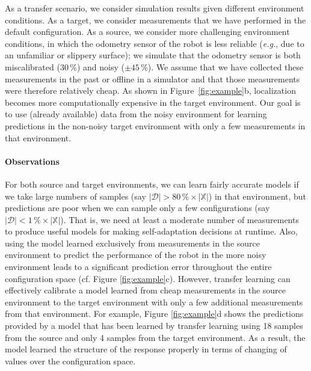 As a transfer scenario, we consider simulation results given
different environment conditions.
As a target, we consider measurements that we have performed in the
default configuration.
As a source, we consider more challenging environment conditions,
in which the odometry sensor of the robot is less reliable
(\emph{e.g.}, due to an unfamiliar or slippery surface); we simulate
that the odometry sensor is both miscalibrated ($30\,\%$) and noisy ($\pm45\,\%$). We assume that we have collected these measurements
in the past or offline in a simulator and that those measurements
were therefore relatively cheap.
As shown in Figure~\ref{fig:example}b, localization becomes
more computationally expensive in the target environment.
Our goal is to use (already available) data from the noisy environment for
learning predictions in the non-noisy target environment with only a few
measurements in that environment.




\paragraph*{Observations}
For both source and target environments, we can learn fairly accurate
models if we take large numbers of samples (say $|\mathcal{D}|>80\,\%\times |\mathbb{X}|$) in that environment, but predictions
are poor when we can sample only a few configurations (say $|\mathcal{D}|<1\,\%\times |\mathbb{X}|$).
That is, we need at least a moderate number of measurements to
produce useful models for making self-adaptation decisions at runtime.
Also, using the model learned exclusively from measurements in the
source environment to predict the performance of the robot in the
more noisy environment leads to a significant prediction error
throughout the entire configuration space (cf. Figure \ref{fig:example}c).
However, transfer learning can effectively calibrate a model
learned from cheap measurements in the source environment to the
target environment with only a few additional measurements
from that environment. For example, Figure \ref{fig:example}d shows the predictions provided by a model that has been learned by transfer learning using 18 samples from the source and only 4 samples from the target environment. As a result, the model learned the structure of the response properly in terms of changing of values over the configuration space.

